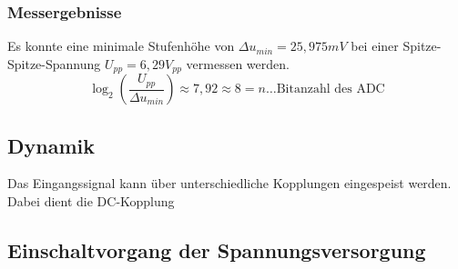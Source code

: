\documentclass[a4paper]{article}
\begin{document}
\subsubsection{Messergebnisse}
Es konnte eine minimale Stufenhöhe von $\Delta u_{min}=25,975 \unit{mV}$ bei einer
Spitze-Spitze-Spannung $U_{pp}=6,29\unit{V_{pp}}$ vermessen werden.
\[ \log_{2}(\frac{U_{pp}}{\Delta u_{min}})\approx 7,92 \approx 8 = n\text{\ldots Bitanzahl des ADC} \]


\subsection{Dynamik}
Das Eingangssignal kann über unterschiedliche Kopplungen eingespeist werden.
Dabei dient die DC-Kopplung 

\subsection{Einschaltvorgang der Spannungsversorgung}
\end{document}
